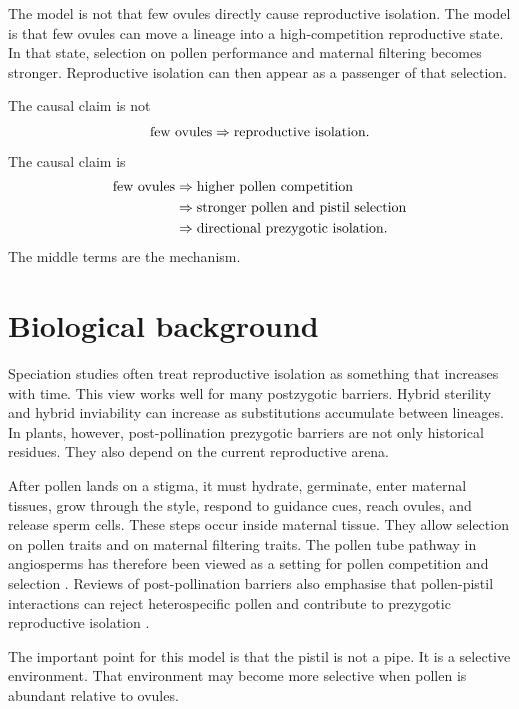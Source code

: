 \documentclass[12pt]{article}
\begin{document}
The model is not that few ovules directly cause reproductive isolation. The model is that few ovules can move a lineage into a high-competition reproductive state. In that state, selection on pollen performance and maternal filtering becomes stronger. Reproductive isolation can then appear as a passenger of that selection.

\begin{conclusionbox}
The causal claim is not
\[
\hbox{few ovules} \Rightarrow \hbox{reproductive isolation}.
\]
The causal claim is
\begin{align*}
\hbox{few ovules}
&\Rightarrow \hbox{higher pollen competition}\\
&\Rightarrow \hbox{stronger pollen and pistil selection}\\
&\Rightarrow \hbox{directional prezygotic isolation}.
\end{align*}
The middle terms are the mechanism.
\end{conclusionbox}

\section{Biological background}

Speciation studies often treat reproductive isolation as something that increases with time. This view works well for many postzygotic barriers. Hybrid sterility and hybrid inviability can increase as substitutions accumulate between lineages. In plants, however, post-pollination prezygotic barriers are not only historical residues. They also depend on the current reproductive arena.

After pollen lands on a stigma, it must hydrate, germinate, enter maternal tissues, grow through the style, respond to guidance cues, reach ovules, and release sperm cells. These steps occur inside maternal tissue. They allow selection on pollen traits and on maternal filtering traits. The pollen tube pathway in angiosperms has therefore been viewed as a setting for pollen competition and selection \citep{Lora2016,LankinenGreen2015}. Reviews of post-pollination barriers also emphasise that pollen-pistil interactions can reject heterospecific pollen and contribute to prezygotic reproductive isolation \citep{WangFilatov2023}.

The important point for this model is that the pistil is not a pipe. It is a selective environment. That environment may become more selective when pollen is abundant relative to ovules.
\end{document}
